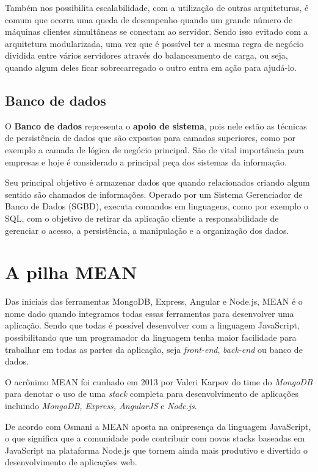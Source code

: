 \documentclass[
	12pt,				%
	openright,			%
	twoside,			%
	a4paper,			%
	english,			%
	brazil				%
	]{abntex2}
\begin{document}
Também nos possibilita escalabilidade, com a utilização de outras arquiteturas, é comum que ocorra uma queda de desempenho quando um grande número de máquinas clientes simultâneas se conectam ao servidor. Sendo isso evitado com a arquitetura modularizada, uma vez que é possível ter a mesma regra de negócio dividida entre vários servidores através do balanceamento de carga, ou seja, quando algum deles ficar sobrecarregado o outro entra em ação para ajudá-lo. 

\subsection{Banco de dados}
\label{subsec:BancoDeDados}

O \textbf{Banco de dados} representa o \textbf{apoio de sistema}, pois nele estão as técnicas de persistência de dados que são expostos para camadas superiores, como por exemplo a camada de lógica de negócio principal. São de vital importância para empresas e hoje é considerado a principal peça dos sistemas da informação.

Seu principal objetivo é armazenar dados que quando relacionados criando algum sentido são chamados de informações. Operado por um Sistema Gerenciador de Banco de Dados (SGBD), executa comandos em linguagens, como por exemplo o SQL, com o objetivo de retirar da aplicação cliente a responsabilidade de gerenciar o acesso, a persistência, a manipulação e a organização dos dados.

\section{A pilha MEAN}

Das iniciais das ferramentas MongoDB, Express, Angular e Node.js, MEAN é o nome dado quando integramos todas essas ferramentas para desenvolver uma aplicação. Sendo que todas é possível desenvolver com a linguagem JavaScript, possibilitando que um programador da linguagem tenha maior facilidade para trabalhar em todas as partes da aplicação, seja \textit{front-end}, \textit{back-end} ou banco de dados.

O acrônimo MEAN foi cunhado em 2013 por Valeri Karpov do time do \textit{MongoDB} \cite{karpov_mean} para denotar o uso de uma \textit{stack} completa para desenvolvimento de aplicações incluindo \textit{MongoDB, Express, AngularJS} e \textit{Node.js}.

De acordo com Osmani\cite{osmani_addy} a MEAN aposta na onipresença da linguagem JavaScript, o que significa que a comunidade pode contribuir com novas stacks baseadas em JavaScript na plataforma Node.js que tornem ainda mais produtivo e divertido o desenvolvimento de aplicações web.
\end{document}
